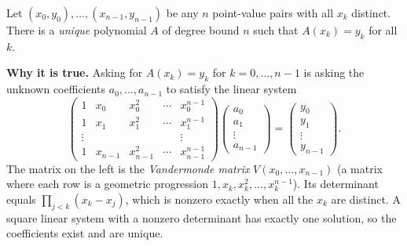 \begin{theorem}\label{ch29:interp-thm}
Let $(x_0,y_0),\dots,(x_{n-1},y_{n-1})$ be any $n$ point-value pairs with
all $x_k$ distinct. There is a \emph{unique} polynomial $A$ of degree bound $n$ such
that $A(x_k)=y_k$ for all $k$.
\end{theorem}

\begin{formalbox}
\textbf{Why it is true.} Asking for $A(x_k)=y_k$ for $k=0,\dots,n-1$ is asking the
unknown coefficients $a_0,\dots,a_{n-1}$ to satisfy the linear system
\[
\begin{pmatrix}
1 & x_0 & x_0^2 & \cdots & x_0^{n-1}\\
1 & x_1 & x_1^2 & \cdots & x_1^{n-1}\\
\vdots & & & & \vdots\\
1 & x_{n-1} & x_{n-1}^2 & \cdots & x_{n-1}^{n-1}
\end{pmatrix}
\begin{pmatrix}a_0\\a_1\\\vdots\\a_{n-1}\end{pmatrix}
=
\begin{pmatrix}y_0\\y_1\\\vdots\\y_{n-1}\end{pmatrix}.
\]
The matrix on the left is the \emph{Vandermonde matrix} $V(x_0,\dots,x_{n-1})$ (a matrix where each row is a geometric progression $1, x_k, x_k^2, \dots, x_k^{n-1}$). Its
determinant equals $\prod_{j<k}(x_k - x_j)$, which is nonzero exactly when all the
$x_k$ are distinct. A square linear system with a nonzero determinant has exactly
one solution, so the coefficients exist and are unique.
\end{formalbox}

